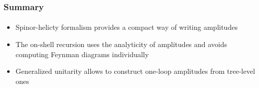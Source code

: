 \documentclass[english]{beamer}
\begin{document}
\begin{frame}
\frametitle{Summary}
\framesubtitle{}
\begin{itemize}
\item<1-> Spinor-helicty formalism provides a compact way of writing amplitudes
\item<2-> The on-shell recursion uses the analyticity of amplitudes and avoids computing Feynman diagrams individually
\item<3-> Generalized unitarity allows to construct one-loop amplitudes from tree-level ones

\end{itemize}

\end{frame}
\end{document}
